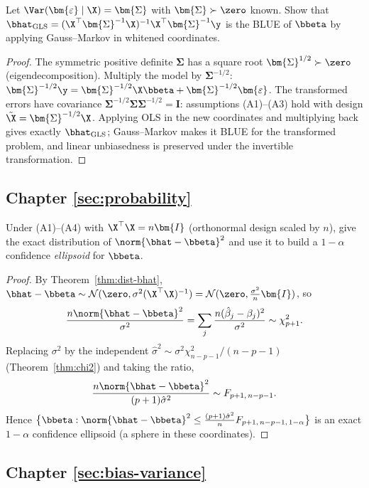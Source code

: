 \begin{exercise}\label{ex:gls}
Let $\Var(\bm{\varepsilon}\mid\X) = \bm{\Sigma}$ with $\bm{\Sigma} \succ \zero$ known. Show that $\bhat_{\mathrm{GLS}} = (\X^\top\bm{\Sigma}^{-1}\X)^{-1}\X^\top\bm{\Sigma}^{-1}\y$ is the BLUE of $\bbeta$ by applying Gauss--Markov in whitened coordinates.
\end{exercise}
\begin{proof}
The symmetric positive definite $\bm{\Sigma}$ has a square root $\bm{\Sigma}^{1/2} \succ \zero$ (eigendecomposition). Multiply the model by $\bm{\Sigma}^{-1/2}$: $\bm{\Sigma}^{-1/2}\y = \bm{\Sigma}^{-1/2}\X \bbeta + \bm{\Sigma}^{-1/2}\bm{\varepsilon}$. The transformed errors have covariance $\bm{\Sigma}^{-1/2}\bm{\Sigma}\bm{\Sigma}^{-1/2} = \bm{I}$: assumptions (A1)--(A3) hold with design $\tilde{\X} = \bm{\Sigma}^{-1/2}\X$. Applying OLS in the new coordinates and multiplying back gives exactly $\bhat_{\mathrm{GLS}}$; Gauss--Markov makes it BLUE for the transformed problem, and linear unbiasedness is preserved under the invertible transformation.
\end{proof}

\subsection*{Chapter \ref{sec:probability}}

\begin{exercise}
Under (A1)--(A4) with $\X^\top\X = n\bm{I}$ (orthonormal design scaled by $n$), give the exact distribution of $\norm{\bhat - \bbeta}^2$ and use it to build a $1-\alpha$ confidence \emph{ellipsoid} for $\bbeta$.
\end{exercise}
\begin{proof}
By Theorem~\ref{thm:dist-bhat}, $\bhat - \bbeta \sim \mathcal{N}(\zero, \sigma^2 (\X^\top\X)^{-1}) = \mathcal{N}(\zero, \tfrac{\sigma^2}{n}\bm{I})$, so
\[
  \frac{n \norm{\bhat - \bbeta}^2}{\sigma^2} = \sum_{j} \frac{n(\hat\beta_j - \beta_j)^2}{\sigma^2} \sim \chi^2_{p+1}.
\]
Replacing $\sigma^2$ by the independent $\hat\sigma^2 \sim \sigma^2 \chi^2_{n-p-1}/(n-p-1)$ (Theorem~\ref{thm:chi2}) and taking the ratio,
\[
  \frac{n \norm{\bhat - \bbeta}^2}{(p+1)\hat\sigma^2} \sim F_{p+1,\, n-p-1}.
\]
Hence $\big\{ \bbeta : \norm{\bhat - \bbeta}^2 \leq \frac{(p+1)\hat\sigma^2}{n} F_{p+1,\,n-p-1,\,1-\alpha} \big\}$ is an exact $1-\alpha$ confidence ellipsoid (a sphere in these coordinates).
\end{proof}

\subsection*{Chapter \ref{sec:bias-variance}}

